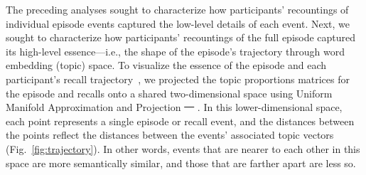 \documentclass[10pt]{article}
\renewcommand{\includegraphics}[2][]{} %
\providecommand{\DIFaddtex}[1]{{\protect\color{blue}\uwave{#1}}} %
\providecommand{\DIFdeltex}[1]{{\protect\color{red}\sout{#1}}}                      %
\providecommand{\DIFaddbegin}{} %
\providecommand{\DIFaddend}{} %
\providecommand{\DIFdelbegin}{} %
\providecommand{\DIFdelend}{} %
\providecommand{\DIFadd}[1]{\texorpdfstring{\DIFaddtex{#1}}{#1}} %
\providecommand{\DIFdel}[1]{\texorpdfstring{\DIFdeltex{#1}}{}} %
\newcommand{\DIFscaledelfig}{0.5}
\newlength{\DIFdelgraphicswidth} %
\newlength{\DIFdelgraphicsheight} %
\newcommand{\DIFaddincludegraphics}[2][]{{\color{blue}\fbox{\DIFOincludegraphics[#1]{#2}}}} %
\newcommand{\DIFdelincludegraphics}[2][]{%
\sbox{\DIFdelgraphicsbox}{\DIFOincludegraphics[#1]{#2}}%
\settoboxwidth{\DIFdelgraphicswidth}{\DIFdelgraphicsbox} %
\settoboxtotalheight{\DIFdelgraphicsheight}{\DIFdelgraphicsbox} %
\scalebox{\DIFscaledelfig}{%
\parbox[b]{\DIFdelgraphicswidth}{\usebox{\DIFdelgraphicsbox}\\[-\baselineskip] \rule{\DIFdelgraphicswidth}{0em}}\llap{\resizebox{\DIFdelgraphicswidth}{\DIFdelgraphicsheight}{%
\setlength{\unitlength}{\DIFdelgraphicswidth}%
\begin{picture}(1,1)%
\thicklines\linethickness{2pt} %
{\color[rgb]{1,0,0}\put(0,0){\framebox(1,1){}}}%
{\color[rgb]{1,0,0}\put(0,0){\line( 1,1){1}}}%
{\color[rgb]{1,0,0}\put(0,1){\line(1,-1){1}}}%
\end{picture}%
}\hspace*{3pt}}} %
} %
\DeclareRobustCommand{\DIFaddbegin}{\DIFOaddbegin \let\includegraphics\DIFaddincludegraphics} %
\DeclareRobustCommand{\DIFaddend}{\DIFOaddend \let\includegraphics\DIFOincludegraphics} %
\DeclareRobustCommand{\DIFdelbegin}{\DIFOdelbegin \let\includegraphics\DIFdelincludegraphics} %
\DeclareRobustCommand{\DIFdelend}{\DIFOaddend \let\includegraphics\DIFOincludegraphics} %
\begin{document}
The preceding analyses sought to characterize how participants' recountings of individual episode events captured the low-level details of each event.  Next, we sought to characterize how participants' recountings of the full episode captured its high-level essence---i.e., the shape of the episode's trajectory through word embedding (topic) space.  To visualize the essence of the episode and each participant's recall trajectory~\citep{HeusEtal18a}, we projected the topic proportions matrices for the episode and recalls onto a shared two-dimensional space using Uniform Manifold Approximation and Projection \DIFdelbegin \DIFdel{~\mbox{%
\citep[UMAP; ][]{McInEtal18}}\hspace{0pt}%
}\DIFdelend \DIFaddbegin \DIFadd{(UMAP)~\mbox{%
\citep{McInEtal18}}\hspace{0pt}%
}\DIFaddend .  In this lower-dimensional space, each point represents a single episode or recall event, and the distances between the points reflect the distances between the events' associated topic vectors (Fig.~\ref{fig:trajectory}). In other words, events that are nearer to each other in this space are more semantically similar, and those that are farther apart are less so.
\end{document}
